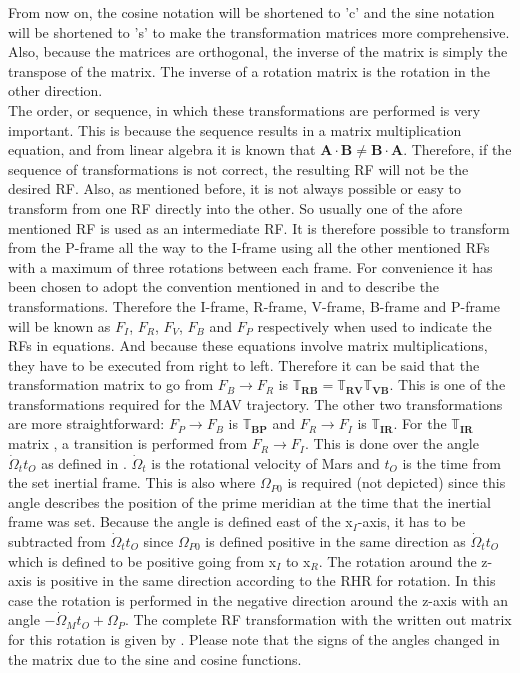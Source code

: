 From now on, the cosine notation will be shortened to 'c' and the sine notation will be shortened to 's' to make the transformation matrices more comprehensive. Also, because the matrices are orthogonal, the inverse of the matrix is simply the transpose of the matrix. The inverse of a rotation matrix is the rotation in the other direction.\\
The order, or sequence, in which these transformations are performed is very important. This is because the sequence results in a matrix multiplication equation, and from linear algebra it is known that $\mathbf{A}\cdot\mathbf{B}\neq\mathbf{B}\cdot\mathbf{A}$. Therefore, if the sequence of transformations is not correct, the resulting \ac{RF} will not be the desired \ac{RF}.  Also, as mentioned before, it is not always possible or easy to transform from one \ac{RF} directly into the other. So usually one of the afore mentioned \ac{RF} is used as an intermediate \ac{RF}. It is therefore possible to transform from the P-frame all the way to the I-frame using all the other mentioned \ac{RF}s with a maximum of three rotations between each frame. For convenience it has been chosen to adopt the convention mentioned in \cite{mooij2013fd} and \cite{mooij2013stat} to describe the transformations. Therefore the I-frame, R-frame, V-frame, B-frame and P-frame will be known as $F_{I}$, $F_{R}$, $F_{V}$, $F_{B}$ and $F_{P}$ respectively when used to indicate the \ac{RF}s in equations. And because these equations involve matrix multiplications, they have to be executed from right to left. Therefore it can be said that the transformation matrix to go from $F_{B} \rightarrow F_{R}$ is $\mathbb{T}_{\mathbf{RB}}=\mathbb{T}_{\mathbf{RV}}\mathbb{T}_{\mathbf{VB}}$. This is one of the transformations required for the \ac{MAV} trajectory. The other two transformations are more straightforward: $F_{P} \rightarrow F_{B}$ is $\mathbb{T}_{\mathbf{BP}}$ and $F_{R} \rightarrow F_{I}$ is $\mathbb{T}_{\mathbf{IR}}$. For the $\mathbb{T}_{\mathbf{IR}}$ matrix , a transition is performed from $F_{R} \rightarrow F_{I}$. This is done over the angle $\dot{\Omega}_{t}t_{O}$ as defined in . $\dot{\Omega}_{t}$ is the rotational velocity of Mars and $t_{O}$ is the time from the set inertial frame. This is also where $\Omega_{P0}$ is required (not depicted) since this angle describes the position of the prime meridian at the time that the inertial frame was set. Because the angle is defined east of the x$_{I}$-axis, it has to be subtracted from $\dot{\Omega}_{t}t_{O}$ since $\Omega_{P0}$ is defined positive in the same direction as $\dot{\Omega}_{t}t_{O}$ which is defined to be positive going from x$_{I}$ to x$_{R}$. The rotation around the z-axis is positive in the same direction according to the \ac{RHR} for rotation. In this case the rotation is performed in the negative direction around the z-axis with an angle $-\dot{\Omega}_{M}t_{O}+\Omega_{P}$. The complete \ac{RF} transformation with the written out matrix for this rotation is given by . Please note that the signs of the angles changed in the matrix due to the sine and cosine functions.

